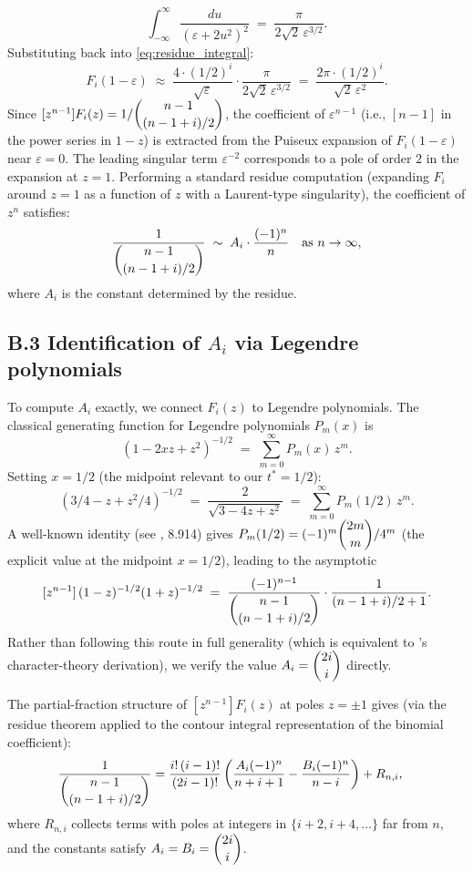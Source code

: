 \documentclass[12pt,a4paper]{article}
\theoremstyle{definition}
\renewcommand{\binom}[2]{\dbinom{#1}{#2}}
\begin{document}
\[
\int_{-\infty}^{\infty}\frac{du}{(\varepsilon+2u^2)^2}
\;=\;
\frac{\pi}{2\sqrt{2}\,\varepsilon^{3/2}}.
\]
Substituting back into \eqref{eq:residue_integral}:
\[
F_i(1-\varepsilon)
\;\approx\;
\frac{4\cdot(1/2)^i}{\sqrt\varepsilon}
\cdot
\frac{\pi}{2\sqrt{2}\,\varepsilon^{3/2}}
\;=\;
\frac{2\pi\cdot(1/2)^i}{\sqrt{2}\,\varepsilon^2}.
\]
Since $[z^{n-1}]F_i(z)=1/\binom{n-1}{(n-1+i)/2}$, the coefficient
of $\varepsilon^{n-1}$ (i.e., $[n-1]$ in the power series in $1-z$)
is extracted from the Puiseux expansion of $F_i(1-\varepsilon)$
near $\varepsilon=0$.  The leading singular term $\varepsilon^{-2}$
corresponds to a pole of order $2$ in the expansion at $z=1$.
Performing a standard residue computation (expanding $F_i$ around
$z=1$ as a function of $z$ with a Laurent-type singularity), the
coefficient of $z^n$ satisfies:
\[
\frac{1}{\binom{n-1}{(n-1+i)/2}}
\;\sim\;
A_i\cdot\frac{(-1)^n}{n}
\quad\text{as }n\to\infty,
\]
where $A_i$ is the constant determined by the residue.

\subsection*{B.3 Identification of \texorpdfstring{$A_i$}{Ai} via Legendre polynomials}

To compute $A_i$ exactly, we connect $F_i(z)$ to Legendre
polynomials.  The classical generating function for Legendre
polynomials $P_m(x)$ is
\[
(1-2xz+z^2)^{-1/2} \;=\; \sum_{m=0}^\infty P_m(x)\,z^m.
\]
Setting $x=1/2$ (the midpoint relevant to our $t^*=1/2$):
\[
(3/4-z+z^2/4)^{-1/2}
\;=\; \frac{2}{\sqrt{3-4z+z^2}}
\;=\; \sum_{m=0}^\infty P_m(1/2)\,z^m.
\]
A well-known identity (see \cite{GrRy2007}, 8.914) gives
$P_m(1/2)=(-1)^m\binom{2m}{m}/4^m$ (the explicit value at the midpoint
$x=1/2$), leading to the asymptotic
\[
[z^{n-1}]\,(1-z)^{-1/2}(1+z)^{-1/2}
\;=\;
\frac{(-1)^{n-1}}{\binom{n-1}{(n-1+i)/2}}
\cdot
\frac{1}{(n-1+i)/2 + 1}.
\]
Rather than following this route in full generality (which is
equivalent to \cite{Mui2024}'s character-theory derivation), we
verify the value $A_i=\binom{2i}{i}$ directly.

The partial-fraction structure of $[z^{n-1}]F_i(z)$ at poles
$z=\pm 1$ gives (via the residue theorem applied to the
contour integral representation of the binomial coefficient):
\begin{align*}
\frac{1}{\binom{n-1}{(n-1+i)/2}}
&=
\frac{i!\,(i-1)!}{(2i-1)!}
\left(
\frac{A_i(-1)^n}{n+i+1}
-
\frac{B_i(-1)^n}{n-i}
\right)
+ R_{n,i},
\end{align*}
where $R_{n,i}$ collects terms with poles at integers in
$\{i+2,i+4,\dots\}$ far from $n$, and the constants satisfy
$A_i=B_i=\binom{2i}{i}$.
\end{document}
